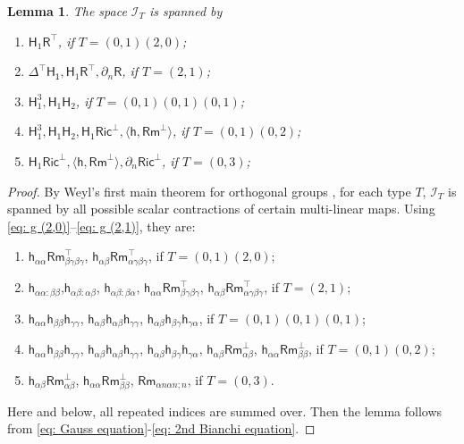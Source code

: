 \documentclass[11pt]{amsart}
\newtheorem{lemma}[theorem]{Lemma}
\theoremstyle{definition}
\numberwithin{equation}{section}
\begin{document}
\begin{lemma}\label{lem: basis of I_T}
    The space $\mathcal I_T$ is spanned by
 	\begin{enumerate}[(1)]
 		\item $\mathsf H_1\mathsf R^\top$, if $T = (0,1)(2,0)$;
 		\item $\mathsf{\Delta^\top H_1}, \mathsf H_1\mathsf R^\top, \partial_n\mathsf R$, if $T = (2,1)$;
 		\item $\mathsf H_1^3, \mathsf H_1\mathsf H_2$, if $T = (0,1)(0,1)(0,1)$;
 		\item $\mathsf H_1^3,\mathsf H_1\mathsf H_2, \mathsf H_1\mathsf{Ric}^\bot, \langle \mathsf h, \mathsf {Rm}^\bot\rangle$, if $T = (0,1)(0,2)$;
 		\item $\mathsf H_1\mathsf{Ric}^\bot, \mathsf \langle \mathsf h, \mathsf {Rm}^\bot\rangle, \partial_n\mathsf{Ric}^\bot$, if $T = (0,3)$;
 	\end{enumerate}
\end{lemma}
\begin{proof}
 	By Weyl's first main theorem for orthogonal groups \cite[Section 1.7]{gilkeyAsymptoticFormulaeSpectral2004}, for each type $T$, $\mathcal I_T$ is spanned by all possible scalar contractions of certain multi-linear maps. Using \eqref{eq: g (2,0)}--\eqref{eq: g (2,1)}, they are:
 	\begin{enumerate}[(1)]
 		\item $\mathsf h_{\alpha\alpha}\mathsf{Rm}^\top_{\beta\gamma\beta\gamma}$, $\mathsf h_{\alpha\beta}\mathsf{Rm}^\top_{\alpha\gamma\beta\gamma}$, if $T = (0,1)(2,0)$;
 		\item $\mathsf h_{\alpha\alpha:\beta\beta}$,$\mathsf h_{\alpha\beta:\alpha\beta}$, $\mathsf h_{\alpha\beta:\beta\alpha}$, $\mathsf h_{\alpha\alpha}\mathsf{Rm}^\top_{\beta\gamma\beta\gamma}$, $\mathsf h_{\alpha\beta}\mathsf{Rm}^\top_{\alpha\gamma\beta\gamma}$, if $T = (2,1)$;
 		\item $\mathsf h_{\alpha\alpha}\mathsf h_{\beta\beta}\mathsf h_{\gamma\gamma}$, $\mathsf h_{\alpha\beta}\mathsf h_{\alpha\beta}\mathsf h_{\gamma\gamma}$, $\mathsf h_{\alpha\beta}\mathsf h_{\beta\gamma}\mathsf h_{\gamma\alpha}$, if $T = (0,1)(0,1)(0,1)$;
 		\item $\mathsf h_{\alpha\alpha}\mathsf h_{\beta\beta}\mathsf h_{\gamma\gamma}$, $\mathsf h_{\alpha\beta}\mathsf h_{\alpha\beta}\mathsf h_{\gamma\gamma}$, $\mathsf h_{\alpha\beta}\mathsf h_{\beta\gamma}\mathsf h_{\gamma\alpha}$, $\mathsf h_{\alpha\beta}\mathsf {Rm}^\bot_{\alpha\beta}$, $\mathsf h_{\alpha\alpha}\mathsf {Rm}^\bot_{\beta\beta}$, if $T = (0,1)(0,2)$;
 		\item $\mathsf h_{\alpha\beta}\mathsf {Rm}^\bot_{\alpha\beta}$, $\mathsf h_{\alpha\alpha}\mathsf {Rm}^\bot_{\beta\beta}$, $\mathsf{Rm}_{\alpha n\alpha n;n}$, if $T = (0,3)$.
 	\end{enumerate}
 	Here and below, all repeated indices are summed over. Then the lemma follows from \eqref{eq: Gauss equation}-\eqref{eq: 2nd Bianchi equation}.
\end{proof}
\end{document}
